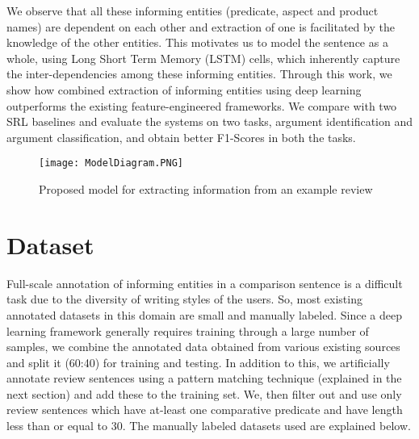 We observe that all these informing entities (predicate, aspect and product names) are dependent on each other and extraction of one is facilitated by the knowledge of the other entities. This motivates us to model the sentence as a whole, using Long Short Term Memory (LSTM) cells, which inherently capture the inter-dependencies among these informing entities. Through this work, we show how combined extraction of informing entities using deep learning outperforms the existing feature-engineered frameworks. We compare with two SRL baselines and evaluate the systems on two tasks, argument identification and argument classification, and obtain better F1-Scores in both the tasks.

\begin{figure*}
\texttt{[image: ModelDiagram.PNG]}
\caption{Proposed model for extracting information from an example review}
\label{modelfig}
\vspace{-0.7em}
\end{figure*}

\section{Dataset}
Full-scale annotation of informing entities in a comparison sentence is a difficult task due to the diversity of writing styles of the users. So, most existing annotated datasets in this domain are small and manually labeled. Since a deep learning framework generally requires training through a large number of samples, we combine the annotated data obtained from various existing sources and split it (60:40) for training and testing. In addition to this, we artificially annotate review sentences using a pattern matching technique (explained in the next section) and add these to the training set. We, then filter out and use only review sentences which have at-least one comparative predicate and have length less than or equal to 30. The manually labeled datasets used are explained below.

